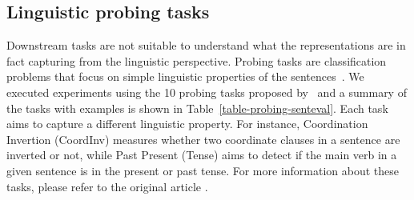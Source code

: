\documentclass{article}
\begin{document}

\subsection{Linguistic probing tasks}
Downstream tasks are not suitable to understand what the representations are in fact capturing from the linguistic perspective. Probing tasks are classification problems that focus on simple linguistic properties of the sentences~\cite{conneau2018you}. We executed experiments using the 10 probing tasks proposed by~\cite{conneau2018you} and a summary of the tasks with examples is shown in Table~\ref{table-probing-senteval}. Each task aims to capture a different linguistic property. For instance, Coordination Invertion (CoordInv) measures whether two coordinate clauses in a sentence are inverted or not, while Past Present (Tense) aims to detect if the main verb in a given sentence is in the present or past tense. For more information about these tasks, please refer to the original article \cite{conneau2018you}.
\end{document}
